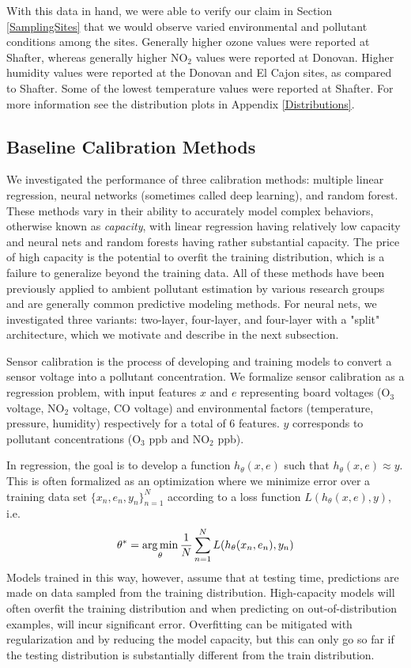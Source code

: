 \documentclass[journal abbreviation, manuscript]{copernicus}
\newcommand{\textus}[1]{$_{\text{#1}}$}
\begin{document}
With this data in hand, we were able to verify our claim in Section \ref{SamplingSites} that we would observe varied environmental and pollutant conditions among the sites. Generally higher ozone values were reported at Shafter, whereas generally higher NO\textus{2} values were reported at Donovan.  Higher humidity values were reported at the Donovan and El Cajon sites, as compared to Shafter.  Some of the lowest temperature values were reported at Shafter.  For more information see the distribution plots in Appendix \ref{Distributions}. 

\subsection{Baseline Calibration Methods}\label{sec:calibration-methods}
We investigated the performance of three calibration methods: multiple linear regression, neural networks (sometimes called deep learning), and random forest.  These methods vary in their ability to accurately model complex behaviors, otherwise known as \textit{capacity}, with linear regression having relatively low capacity and neural nets and random forests having rather substantial capacity.  The price of high capacity is the potential to overfit the training distribution, which is a failure to generalize beyond the training data.  All of these methods have been previously applied to ambient pollutant estimation by various research groups \cite{Piedrahita2014,Spinelle2015,SPINELLE2017706,Sadighi2018,Zimmerman2018,Casey2018testing} and are generally common predictive modeling methods.  For neural nets, we investigated three variants: two-layer, four-layer, and four-layer with a "split" architecture, which we motivate and describe in the next subsection.

Sensor calibration is the process of developing and training models to convert a sensor voltage into a pollutant concentration. We formalize sensor calibration as a regression problem, with input features $x$ and $e$ representing board voltages (O\textus{3} voltage, NO\textus{2} voltage, CO voltage) and environmental factors (temperature, pressure, humidity) respectively for a total of 6 features. $y$ corresponds to pollutant concentrations (O\textus{3} ppb and NO\textus{2} ppb). 

In regression, the goal is to develop a function $h_\theta(x, e)$ such that $h_\theta(x, e) \approx y$. This is often formalized as an optimization where we minimize error over a training data set $\{x_n, e_n, y_n\}_{n = 1}^N$ according to a loss function $L(h_\theta(x, e), y)$, i.e. 
\begin{equation}
\theta^* = \operatorname*{arg\,min}_\theta \frac{1}{N}\sum_{n = 1}^N L(h_\theta(x_n, e_n), y_n)
\end{equation}
Models trained in this way, however, assume that at testing time, predictions are made on data sampled from the training distribution. High-capacity models will often overfit the training distribution and when predicting on out-of-distribution examples, will incur significant error. Overfitting can be mitigated with regularization and by reducing the model capacity, but this can only go so far if the testing distribution is substantially different from the train distribution.
\end{document}
